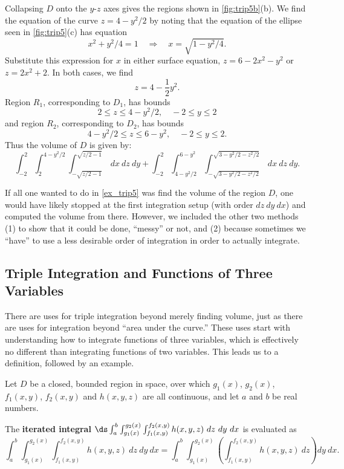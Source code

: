 \begin{example}
Collapsing $D$ onto the $y$-$z$ axes gives the regions shown in \autoref{fig:trip5b}(b). We find the equation of the curve $z=4-y^2/2$ by noting that the equation of the ellipse seen in \autoref{fig:trip5}(c) has equation 
\[x^2+y^2/4=1 \quad \Rightarrow \quad x = \sqrt{1-y^2/4}.\]  
Substitute this expression for $x$ in either surface equation, $z=6-2x^2-y^2$ or $z=2x^2+2$. In both cases, we find
\[z=4-\frac12y^2.\]
Region $R_1$, corresponding to $D_1$, has bounds
\[2\leq z\leq 4-y^2/2,\quad -2\leq y\leq 2\]
and region $R_2$, corresponding to $D_2$, has bounds
\[4-y^2/2\leq z\leq 6-y^2,\quad -2\leq y\leq 2.\]
Thus the volume of $D$ is given by:
\[\int_{-2}^2\int_2^{4-y^2/2}\int_{-\sqrt{z/2-1}}^{\sqrt{z/2-1}}\ dx\ dz\ dy +\int_{-2}^2\int_{4-y^2/2}^{6-y^2}\int_{-\sqrt{3-y^2/2-z^2/2}}^{\sqrt{3-y^2/2-z^2/2}}\ dx\ dz\ dy.\]
\end{example}

If all one wanted to do in \autoref{ex_trip5} was find the volume of the region $D$, one would have likely stopped at the first integration setup (with order $dz\ dy\ dx$) and computed the volume from there. However, we included the other two methods (1) to show that it could be done, ``messy'' or not, and (2) because sometimes we ``have'' to use a less desirable order of integration in order to actually integrate.

\subsection{Triple Integration and Functions of Three Variables}

There are uses for triple integration beyond merely finding volume, just as there are uses for integration beyond ``area under the curve.'' These uses start with understanding how to integrate functions of three variables, which is effectively no different than integrating functions of two variables. This leads us to a definition, followed by an example.

\begin{definition}\label{def:triple_integral_2}
Let $D$ be a closed, bounded region in space, over which $g_1(x)$, $g_2(x)$, $f_1(x,y)$, $f_2(x,y)$ and $h(x,y,z)$ are all continuous, and let $a$ and $b$ be real numbers.\bigskip

The \textbf{iterated integral} $\ds \int_a^b\int_{g_1(x)}^{g_2(x)}\int_{f_1(x,y)}^{f_2(x,y)} h(x,y,z)\ dz\ dy\ dx$ is evaluated as
\small
\[\int_a^b\int_{g_1(x)}^{g_2(x)}\int_{f_1(x,y)}^{f_2(x,y)} h(x,y,z)\ dz\ dy\ dx = \int_a^b\int_{g_1(x)}^{g_2(x)}\left(\int_{f_1(x,y)}^{f_2(x,y)} h(x,y,z)\ dz\right) dy\ dx.\]
\end{definition}

